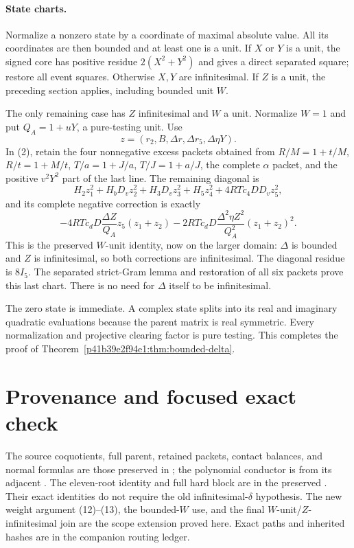 \paragraph{State charts.}
Normalize a nonzero state by a coordinate of maximal absolute value.
All its coordinates are then bounded and at least one is a unit. If
$X$ or $Y$ is a unit, the signed core has positive residue
$2(X^2+Y^2)$ and gives a direct separated square; restore all event
squares. Otherwise $X,Y$ are infinitesimal. If $Z$ is a unit, the
preceding section applies, including bounded unit $W$.

The only remaining case has $Z$ infinitesimal and $W$ a unit.
Normalize $W=1$ and put $Q_A=1+uY$, a pure-testing unit. Use
\[
 z=(r_2,B,\Delta r,\Delta r_5,\Delta\eta Y).
\]
In (2), retain the four nonnegative excess packets obtained from
$R/M=1+t/M$, $R/t=1+M/t$, $T/a=1+J/a$, $T/J=1+a/J$,
the complete $\alpha$ packet, and the positive $v^2Y^2$ part of the
last line. The remaining diagonal is
\[
 H_2z_1^2+H_bD_vz_2^2+H_3D_vz_3^2+H_5z_4^2
                   +4RTc_4DD_vz_5^2,
\]
and its complete negative correction is exactly
\[
 -4RTc_dD\frac{\Delta Z}{Q_A}z_5(z_1+z_2)
 -2RTc_dD\frac{\Delta^2\eta Z^2}{Q_A^2}(z_1+z_2)^2.
\]
This is the preserved $W$-unit identity, now on the larger domain:
$\Delta$ is bounded and $Z$ is infinitesimal, so both corrections
are infinitesimal. The diagonal residue is $8I_5$. The separated
strict-Gram lemma and restoration of all six packets prove this
last chart. There is no need for $\Delta$ itself to be infinitesimal.

The zero state is immediate. A complex state splits into its real and
imaginary quadratic evaluations because the parent matrix is real
symmetric. Every normalization and projective clearing factor is
pure testing. This completes the proof of Theorem~\ref{p41b39e2f94e1:thm:bounded-delta}.

\section*{Provenance and focused exact check}

The source coquotients, full parent, retained packets, contact balances,
and normal formulas are those preserved in
; the polynomial
conductor is from its adjacent .
The eleven-root identity and full hard block are in the preserved
. Their exact identities
do not require the old infinitesimal-$\delta$ hypothesis. The new
weight argument (12)--(13), the bounded-$W$ use, and the final
$W$-unit/$Z$-infinitesimal join are the scope extension proved here.
Exact paths and inherited hashes are in the companion routing ledger.

